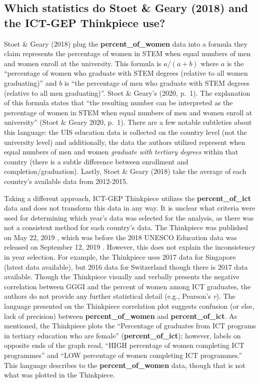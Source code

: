 \documentclass[]{book}
\begin{document}
\subsection{Which statistics do Stoet \& Geary (2018) and the ICT-GEP
Thinkpiece
use?}\label{which-statistics-do-stoet-geary-2018-and-the-ict-gep-thinkpiece-use}

Stoet \& Geary (2018) plug the \textbf{percent\_of\_women} data into a
formula they claim represents the percentage of women in STEM when equal
numbers of men and women enroll at the university. This formula is
\(a/(a+b)\) where \(a\) is the ``percentage of women who graduate with
STEM degrees (relative to all women graduating)'' and \(b\) is ``the
percentage of men who graduate with STEM degrees (relative to all men
graduating)''. Stoet \& Geary's (2020, p.~1). The explanation of this
formula states that ``the resulting number can be interpreted as the
percentage of women in STEM when equal numbers of men and women enroll
at university'' (Stoet \& Geary 2020, p.~1). There are a few notable
subtleties about this language: the UIS education data is collected on
the country level (not the university level) and additionally, the data
the authors utilized represent when equal numbers of men and women
\emph{graduate with tertiary degrees} within that country (there is a
subtle difference between enrollment and completion/graduation). Lastly,
Stoet \& Geary (2018) take the average of each country's available data
from 2012-2015.

Taking a different approach, ICT-GEP Thinkpiece utilizes the
\textbf{percent\_of\_ict} data and does not transform this data in any
way. It is unclear what criteria were used for determining which year's
data was selected for the analysis, as there was not a consistent method
for each country's data. The Thinkpiece was published on May 22, 2019
\citep{khazanMoreGenderEquality2018}, which was before the 2018 UNESCO
Education data was released on September 12, 2019
\citep{UISEducationData2019}. However, this does not explain the
inconsistency in year selection. For example, the Thinkpiece uses 2017
data for Singapore (latest data available), but 2016 data for
Switzerland though there is 2017 data available. Though the Thinkpiece
visually and verbally presents the negative correlation between GGGI and
the percent of women among ICT graduates, the authors do not provide any
further statistical detail (e.g., Pearson's \emph{r}). The language
presented on the Thinkpiece correlation plot suggests confusion (or
else, lack of precision) between \textbf{percent\_of\_women} and
\textbf{percent\_of\_ict}. As mentioned, the Thinkpiece plots the
``Percentage of graduates from ICT programs in tertiary education who
are female'' (\textbf{percent\_of\_ict}); however, labels on opposite
ends of the graph read, ``HIGH percentage of women completing ICT
programmes'' and ``LOW percentage of women completing ICT programmes.''
This language describes to the \textbf{percent\_of\_women} data, though
that is not what was plotted in the Thinkpiece.
\end{document}
